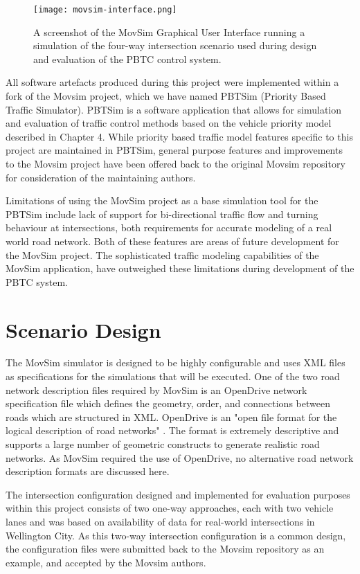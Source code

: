 \begin{figure}[]
\centering
	\texttt{[image: movsim-interface.png]}
	\caption{ A screenshot of the MovSim Graphical User Interface running a simulation of the four-way intersection scenario used during design and evaluation of the PBTC control system. }
\label{intersectiondiagram}
\end{figure}

All software artefacts produced during this project were implemented within a fork of the Movsim project, which we have named PBTSim (Priority Based Traffic Simulator). PBTSim is a software application that allows for simulation and evaluation of traffic control methods based on the vehicle priority model described in Chapter 4. While priority based traffic model features specific to this project are maintained in PBTSim, general purpose features and improvements to the Movsim project have been offered back to the original Movsim repository for consideration of the maintaining authors.

Limitations of using the MovSim project as a base simulation tool for the PBTSim include lack of support for bi-directional traffic flow and turning behaviour at intersections, both requirements for accurate modeling of a real world road network. Both of these features are areas of future development for the MovSim project. The sophisticated traffic modeling capabilities of the MovSim application, have outweighed these limitations during development of the PBTC system.

\section{Scenario Design}

The MovSim simulator is designed to be highly configurable and uses XML files as specifications for the simulations that will be executed. One of the two road network description files required by MovSim is an OpenDrive network specification file which defines the geometry, order, and connections between roads which are structured in XML. OpenDrive is an "open file format for the logical description of road networks" \cite{opendrive}. The format is extremely descriptive and supports a large number of geometric constructs to generate realistic road networks. As MovSim required the use of OpenDrive, no alternative road network description formats are discussed here.

The intersection configuration designed and implemented for evaluation purposes within this project consists of two one-way approaches, each with two vehicle lanes and was based on availability of data for real-world intersections in Wellington City. As this two-way intersection configuration is a common design, the configuration files were submitted back to the Movsim repository as an example, and accepted by the Movsim authors. 

